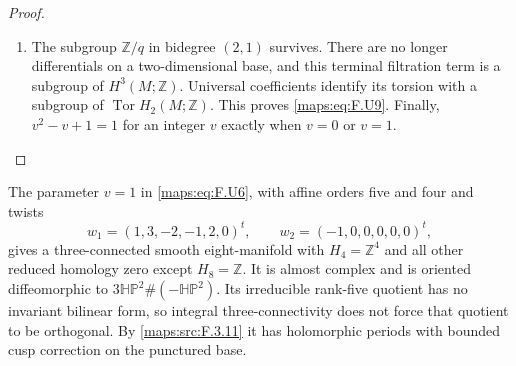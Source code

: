\begin{proof}
\begin{enumerate}[label={$\langle1\rangle$\arabic*.}]
\item The subgroup $\mathbb Z/q$ in bidegree $(2,1)$ survives.
There are no longer differentials on a two-dimensional base,
and this terminal filtration term is a subgroup of
$H^3(M;\mathbb Z)$.  Universal coefficients identify its
torsion with a subgroup of $\operatorname{Tor}H_2(M;\mathbb Z)$.
This proves \eqref{maps:eq:F.U9}.  Finally, $v^2-v+1=1$ for an integer $v$
exactly when $v=0$ or $v=1$.

\end{enumerate}
\end{proof}




\begin{theorem}\hypertarget{tag-02N7}{}\label{maps:src:F.2.18}


The parameter $v=1$ in \eqref{maps:eq:F.U6}, with affine orders five and four
and twists
\[
 w_1=(1,3,-2,-1,2,0)^t,\qquad
 w_2=(-1,0,0,0,0,0)^t,
\]
gives a three-connected smooth eight-manifold with
$H_4=\mathbb Z^4$ and all other reduced homology zero except
$H_8=\mathbb Z$.  It is almost complex and is oriented
diffeomorphic to $3\mathbb{HP}^2\#(-\mathbb{HP}^2)$.
Its irreducible rank-five quotient has no invariant bilinear
form, so integral three-connectivity does not force that
quotient to be orthogonal.  By \cref{maps:src:F.3.11} it has holomorphic periods with bounded cusp correction on the punctured base.

\end{theorem}


